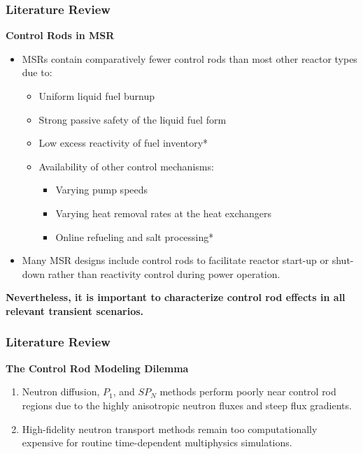 \begin{frame}
  \frametitle{Literature Review}
  \textbf{Control Rods in MSR}
  \begin{itemize}
    \item MSRs contain comparatively fewer control rods than most other reactor types due to:
      \begin{itemize}
        \item Uniform liquid fuel burnup
        \item Strong passive safety of the liquid fuel form
        \item Low excess reactivity of fuel inventory*
        \item Availability of other control mechanisms:
        \begin{itemize}
          \item Varying pump speeds
          \item Varying heat removal rates at the heat exchangers
          \item Online refueling and salt processing*
        \end{itemize}
      \end{itemize}
    \item Many MSR designs include control rods to facilitate reactor start-up or shut-down rather
      than reactivity control during power operation.
  \end{itemize}
  \pause
  \textbf{Nevertheless, it is important to characterize control rod effects in all relevant
  transient scenarios.}
\end{frame}

\begin{frame}
  \frametitle{Literature Review}
  \textbf{The Control Rod Modeling Dilemma}
  \begin{enumerate}
    \item Neutron diffusion, $P_1$, and $SP_N$ methods perform poorly near control rod regions
      due to the highly anisotropic neutron fluxes and steep flux gradients.
    \item High-fidelity neutron transport methods remain too computationally expensive for routine
      time-dependent multiphysics simulations.
  \end{enumerate}
\end{frame}

